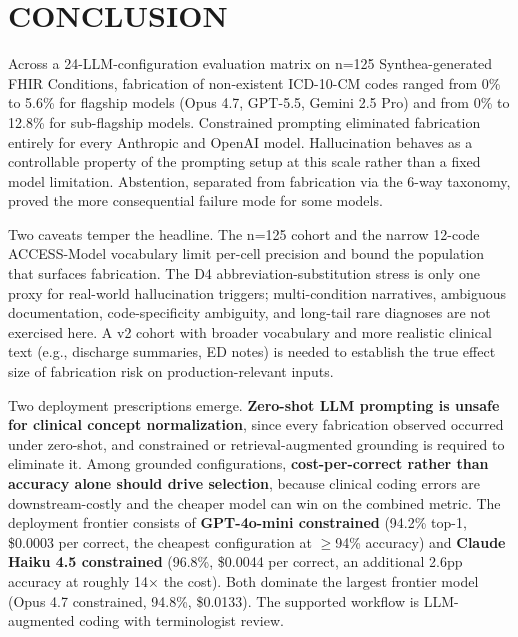 \section{CONCLUSION}\label{conclusion}

Across a 24-LLM-configuration evaluation matrix on n=125
Synthea-generated FHIR Conditions, fabrication of non-existent
ICD-10-CM codes ranged from 0\% to 5.6\% for flagship models (Opus
4.7, GPT-5.5, Gemini 2.5 Pro) and from 0\% to 12.8\% for sub-flagship
models. Constrained prompting eliminated fabrication entirely for
every Anthropic and OpenAI model. Hallucination behaves as a
controllable property of the prompting setup at this scale rather
than a fixed model limitation. Abstention, separated from
fabrication via the 6-way taxonomy, proved the more consequential
failure mode for some models.

Two caveats temper the headline. The n=125 cohort and the narrow
12-code ACCESS-Model vocabulary limit per-cell precision and bound
the population that surfaces fabrication. The D4
abbreviation-substitution stress is only one proxy for real-world
hallucination triggers; multi-condition narratives, ambiguous
documentation, code-specificity ambiguity, and long-tail rare
diagnoses are not exercised here. A v2 cohort with broader
vocabulary and more realistic clinical text (e.g., discharge
summaries, ED notes) is needed to establish the true effect size
of fabrication risk on production-relevant inputs.

Two deployment prescriptions emerge. \textbf{Zero-shot LLM prompting is
unsafe for clinical concept normalization}, since every
fabrication observed occurred under zero-shot, and constrained or
retrieval-augmented grounding is required to eliminate it. Among
grounded configurations, \textbf{cost-per-correct rather than accuracy
alone should drive selection}, because clinical coding errors are
downstream-costly and the cheaper model can win on the combined
metric. The deployment frontier consists of \textbf{GPT-4o-mini
constrained} (94.2\% top-1, \$0.0003 per correct, the cheapest
configuration at $\geq$94\% accuracy) and \textbf{Claude Haiku 4.5
constrained} (96.8\%, \$0.0044 per correct, an additional 2.6pp
accuracy at roughly 14× the cost). Both dominate the largest
frontier model (Opus 4.7 constrained, 94.8\%, \$0.0133). The
supported workflow is LLM-augmented coding with terminologist
review.
